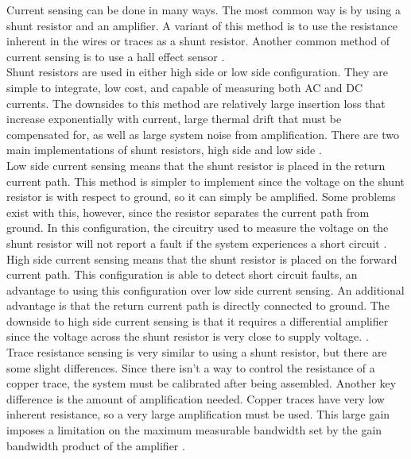 Current sensing can be done in many ways. The most common way is by using a shunt resistor and an amplifier. A variant of this method is to use the resistance inherent in the wires or traces as a shunt resistor. Another common method of current sensing is to use a hall effect sensor \cite{Current_Sensing}. \\
\newline
Shunt resistors are used in either high side or low side configuration. They are simple to integrate, low cost, and capable of measuring both AC and DC currents. The downsides to this method are relatively large insertion loss that increase exponentially with current, large thermal drift that must be compensated for, as well as large system noise from amplification. There are two main implementations of shunt resistors, high side and low side \cite{Current_Sensing}. \\
\newline
Low side current sensing means that the shunt resistor is placed in the return current path. This method is simpler to implement since the voltage on the shunt resistor is with respect to ground, so it can simply be amplified. Some problems exist with this, however, since the resistor separates the current path from ground. In this configuration, the circuitry used to measure the voltage on the shunt resistor will not report a fault if the system experiences a short circuit \cite{Current_Sensing}. \\
\newline 
High side current sensing means that the shunt resistor is placed on the forward current path. This configuration is able to detect short circuit faults, an advantage to using this configuration over low side current sensing. An additional advantage is that the return current path is directly connected to ground. The downside to high side current sensing is that it requires a differential amplifier since the voltage across the shunt resistor is very close to supply voltage. \cite{Current_Sensing}. \\
\newline
Trace resistance sensing is very similar to using a shunt resistor, but there are some slight differences. Since there isn't a way to control the resistance of a copper trace, the system must be calibrated after being assembled. Another key difference is the amount of amplification needed. Copper traces have very low inherent resistance, so a very large amplification must be used. This large gain imposes a limitation on the maximum measurable bandwidth set by the gain bandwidth product of the amplifier \cite{Current_Sensing}. \\
